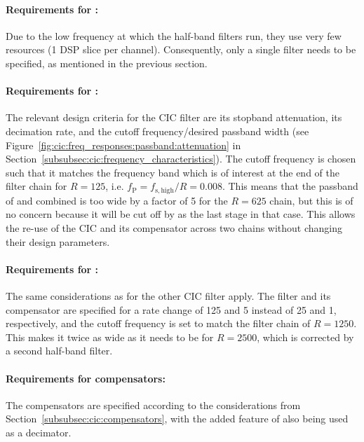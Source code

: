 \paragraph{Requirements for :} Due to  the low frequency at which
the half-band filters run, they use  very few resources (\num{1} DSP slice per
channel).   Consequently, only  a  single  filter needs  to  be specified,  as
mentioned in the previous section.

\paragraph{Requirements     for     :} The     relevant     design
criteria    for   the    CIC    filter   are    its   stopband    attenuation,
its   decimation    rate,   and   the   cutoff    frequency/desired   passband
width    (see   Figure~\ref{fig:cic:freq_responses:passband:attenuation}    in
Section~\ref{subsubsec:cic:frequency_characteristics}).  The  cutoff frequency
is chosen such that it matches the  frequency band which is of interest at the
end of the filter chain  for $R=125$, i.e. $f_\mathrm{P} = f_\mathrm{s,high}/R
=  0.008$. This means  that  the passband  of   and  
combined is too wide by a factor of \num{5} for the $R=625$ chain, but this is
of no concern because it will be cut  off by  as the last stage in
that case. This  allows the re-use of  the CIC and its  compensator across two
chains without changing their design parameters.

\paragraph{Requirements for :} The same considerations as for the
other CIC  filter apply. The filter  and its  compensator are specified  for a
rate  change  of  \num{125}  and  \num{5} instead  of  \num{25}  and  \num{1},
respectively, and  the cutoff frequency  is set to  match the filter  chain of
$R=1250$. This makes it twice as wide as it needs to be for $R=2500$, which is
corrected by a second half-band filter.

\paragraph{Requirements  for  compensators:} The  compensators  are  specified
according to the considerations from Section~\ref{subsubsec:cic:compensators},
with the added feature of  also being used as a decimator.

